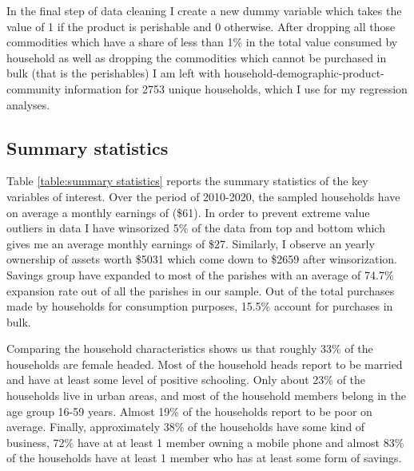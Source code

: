 \documentclass[12pt]{article}
\begin{document}
{\hspace{1cm} In the final step of data cleaning I create a new dummy variable which takes the value of 1 if the product is perishable and 0 otherwise. After dropping all those commodities which have a share of less than 1\% in the total value consumed by household as well as dropping the commodities which cannot be purchased in bulk (that is the perishables) I am left with household-demographic-product-community information for 2753 unique households, which I use for my regression analyses.

\subsection{Summary statistics}\label{sec:summary statistics}
\hspace{1cm} Table \ref{table:summary statistics} reports the summary statistics of the key variables of interest. Over the period of 2010-2020, the sampled households have on average a monthly earnings of (\$61). In order to prevent extreme value outliers in data I have winsorized 5\% of the data from top and bottom which gives me an average monthly earnings of \$27. Similarly, I observe an yearly ownership of assets worth \$5031 which come down to \$2659 after winsorization. Savings group have expanded to most of the parishes with an average of 74.7\% expansion rate out of all the parishes in our sample. Out of the total purchases made by households for consumption purposes, 15.5\% account for purchases in bulk.

\hspace{1cm} Comparing the household characteristics shows us that roughly 33\% of the households are female headed. Most of the household heads report to be married and have at least some level of positive schooling. Only about 23\% of the households live in urban areas, and most of the household members belong in the age group 16-59 years. Almost 19\% of the households report to be poor on average. Finally, approximately 38\% of the households have some kind of business, 72\% have at at least 1 member owning a mobile phone and almost 83\% of the households have at least 1 member who has at least some form of savings. 

}
\end{document}
